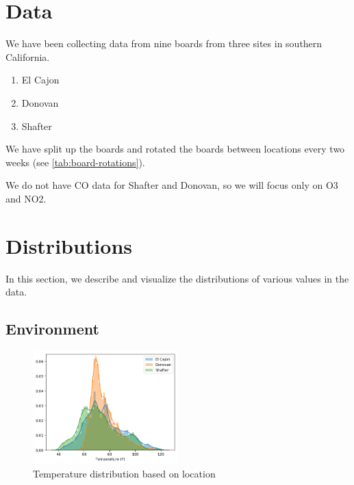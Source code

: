 \documentclass[journal abbreviation, manuscript]{copernicus}
\begin{document}

\appendix
\setcounter{table}{0}

\section{Data}

We have been collecting data from nine boards
from three sites in southern California.
\begin{enumerate}
    \item El Cajon
    \item Donovan
    \item Shafter
\end{enumerate}
We have split up the boards and rotated the boards
between locations every two weeks (see \autoref{tab:board-rotations}).

We do not have CO data for Shafter and Donovan, so we will focus only on
O3 and NO2.

\section{Distributions}
In this section, we describe
and visualize the distributions
of various values in the data.

\subsection{Environment}

\begin{figure}[H]
\centering
\includegraphics[width=0.5\textwidth]{results/distributions/temperature.png}
\caption{Temperature distribution based on
location}
\label{fig:temperature}
\end{figure}
\end{document}
